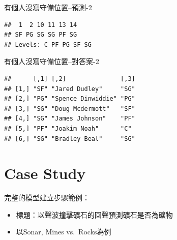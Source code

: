 \documentclass[]{book}
\newenvironment{Shaded}{\begin{snugshade}}{\end{snugshade}}
\newcommand{\CommentTok}[1]{\textcolor[rgb]{0.56,0.35,0.01}{\textit{#1}}}
\newcommand{\DataTypeTok}[1]{\textcolor[rgb]{0.13,0.29,0.53}{#1}}
\newcommand{\KeywordTok}[1]{\textcolor[rgb]{0.13,0.29,0.53}{\textbf{#1}}}
\newcommand{\NormalTok}[1]{#1}
\newcommand{\OperatorTok}[1]{\textcolor[rgb]{0.81,0.36,0.00}{\textbf{#1}}}
\newcommand{\StringTok}[1]{\textcolor[rgb]{0.31,0.60,0.02}{#1}}
\providecommand{\tightlist}{%
  \setlength{\itemsep}{0pt}\setlength{\parskip}{0pt}}
\begin{document}
有個人沒寫守備位置--預測-2

\begin{Shaded}
\end{Shaded}

\begin{verbatim}
##  1  2 10 11 13 14 
## SF PG SG SG PF SG 
## Levels: C PF PG SF SG
\end{verbatim}

有個人沒寫守備位置--對答案-2

\begin{Shaded}
\end{Shaded}

\begin{verbatim}
##      [,1] [,2]               [,3]
## [1,] "SF" "Jared Dudley"     "SG"
## [2,] "PG" "Spence Dinwiddie" "PG"
## [3,] "SG" "Doug Mcdermott"   "SF"
## [4,] "SG" "James Johnson"    "PF"
## [5,] "PF" "Joakim Noah"      "C" 
## [6,] "SG" "Bradley Beal"     "SG"
\end{verbatim}

\hypertarget{case-study}{%
\section{Case Study}\label{case-study}}

完整的模型建立步驟範例：

\begin{itemize}
\tightlist
\item
  標題：以聲波撞擊礦石的回聲預測礦石是否為礦物
\item
  以Sonar, Mines vs.~Rocks為例
\end{itemize}
\end{document}
